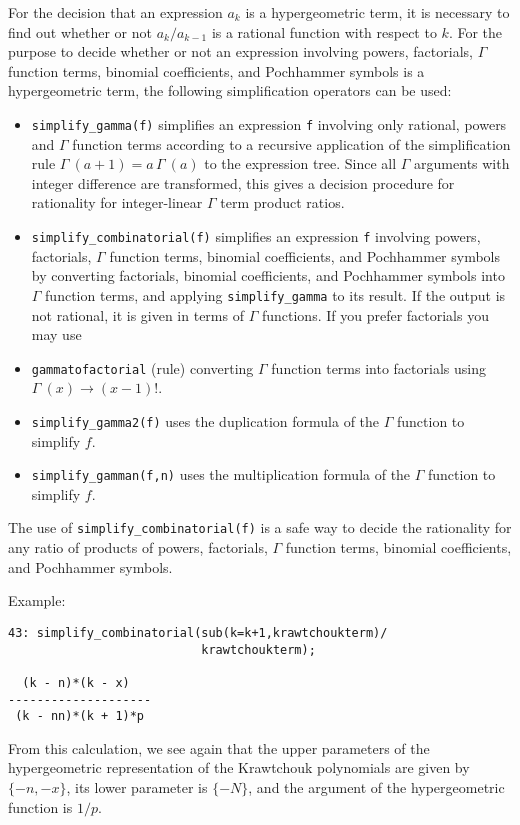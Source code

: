 For the decision that an expression $a_k$ is a hypergeometric term, it is
necessary to find out whether or not $a_{k}/a_{k-1}$ is a rational
function with respect to $k$. For the purpose to decide
whether or not an expression involving powers, factorials,
$\Gamma$ function terms,
binomial coefficients, and Pochhammer symbols is a hypergeometric term,
the following simplification operators can be used:
\begin{itemize}
\item
\texttt{simplify\_gamma(f)} simplifies an expression \texttt{f} involving
only rational, powers and $\Gamma$ function terms according to a recursive
application of the simplification rule $\Gamma\:(a+1)=a\,\Gamma\:(a)$
to the expression tree. Since all $\Gamma$ arguments with integer difference
are transformed, this gives a decision procedure for rationality
for integer-linear $\Gamma$ term product ratios.
\item
\texttt{simplify\_combinatorial(f)} simplifies an expression \texttt{f}
involving powers, factorials, $\Gamma$ function terms,
binomial coefficients, and Pochhammer symbols by converting
factorials, binomial coefficients, and Poch\-hammer symbols into
$\Gamma$ function terms, and applying \texttt{simplify\_gamma} to its
result. If the output is not rational,
it is given in terms of $\Gamma$ functions. If you prefer factorials
you may use
\item
\texttt{gammatofactorial} (rule) converting $\Gamma$ function terms into
factorials using $\Gamma\:(x)\rightarrow (x-1)!$.
\item
\texttt{simplify\_gamma2(f)}
uses the duplication formula of the $\Gamma$ function to simplify $f$.
\item
\texttt{simplify\_gamman(f,n)}
uses the multiplication formula of the $\Gamma$ function to simplify $f$.
\end{itemize}
The use of \texttt{simplify\_combinatorial(f)} is a safe way to
decide the rationality for any ratio of products of powers, factorials,
$\Gamma$ function terms, binomial coefficients, and Pochhammer symbols.

Example:

{\small
\begin{verbatim}
43: simplify_combinatorial(sub(k=k+1,krawtchoukterm)/
                           krawtchoukterm);

  (k - n)*(k - x)
--------------------
 (k - nn)*(k + 1)*p
\end{verbatim}
}\noindent
From this calculation, we see again that the upper parameters of
the hypergeometric representation of the Krawtchouk polynomials are given by
$\{-n,-x\}$, its lower parameter is $\{-N\}$, and the argument of the
hypergeometric function is $1/p$.

